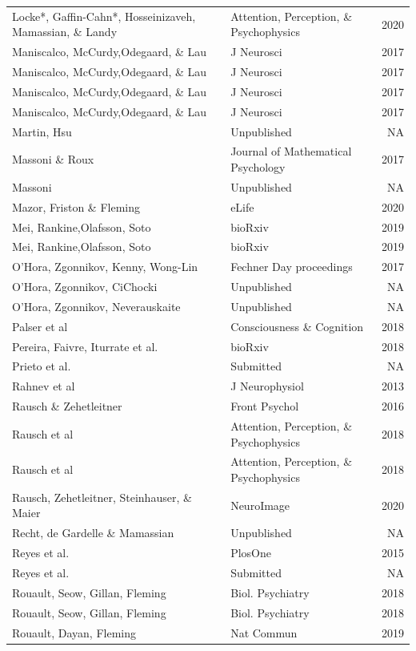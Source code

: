 \documentclass[
]{article}
\begin{document}
\begin{longtable}[t]{llr}
Locke*, Gaffin-Cahn*, Hosseinizaveh, Mamassian, \& Landy & Attention, Perception, \& Psychophysics & 2020\\
\addlinespace
Maniscalco, McCurdy,Odegaard, \& Lau & J Neurosci & 2017\\
Maniscalco, McCurdy,Odegaard, \& Lau & J Neurosci & 2017\\
Maniscalco, McCurdy,Odegaard, \& Lau & J Neurosci & 2017\\
Maniscalco, McCurdy,Odegaard, \& Lau & J Neurosci & 2017\\
Martin, Hsu & Unpublished & NA\\
\addlinespace
Massoni \& Roux & Journal of Mathematical Psychology & 2017\\
Massoni & Unpublished & NA\\
Mazor, Friston \& Fleming & eLife & 2020\\
Mei, Rankine,Olafsson, Soto & bioRxiv & 2019\\
Mei, Rankine,Olafsson, Soto & bioRxiv & 2019\\
\addlinespace
O'Hora, Zgonnikov, Kenny, Wong-Lin & Fechner Day proceedings & 2017\\
O'Hora, Zgonnikov, CiChocki & Unpublished & NA\\
O'Hora, Zgonnikov, Neverauskaite & Unpublished & NA\\
Palser et al & Consciousness \& Cognition & 2018\\
Pereira, Faivre, Iturrate et al. & bioRxiv & 2018\\
\addlinespace
Prieto et al. & Submitted & NA\\
Rahnev et al & J Neurophysiol & 2013\\
Rausch \& Zehetleitner & Front Psychol & 2016\\
Rausch et al & Attention, Perception, \& Psychophysics & 2018\\
Rausch et al & Attention, Perception, \& Psychophysics & 2018\\
\addlinespace
Rausch, Zehetleitner, Steinhauser, \& Maier & NeuroImage & 2020\\
Recht, de Gardelle \& Mamassian & Unpublished & NA\\
Reyes et al. & PlosOne & 2015\\
Reyes et al. & Submitted & NA\\
Rouault, Seow, Gillan, Fleming & Biol. Psychiatry & 2018\\
\addlinespace
Rouault, Seow, Gillan, Fleming & Biol. Psychiatry & 2018\\
Rouault, Dayan, Fleming & Nat Commun & 2019\\

\end{longtable}
\end{document}
